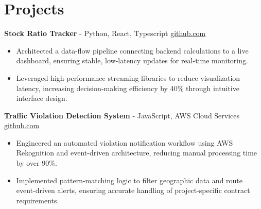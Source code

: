 \documentclass[11pt]{article}       %
\begin{document}

\vspace{-18.5pt}

\section*{Projects}

\textbf{Stock Ratio Tracker}{ - Python, React, Typescript} \hfill \href{https://github.com/Monica20030707/tradingDashboard-UI}{github.com} \\
\vspace{-9pt}
\begin{itemize}
  \item Architected a data-flow pipeline connecting backend calculations to a live dashboard, ensuring stable, low-latency updates for real-time monitoring.
  \item Leveraged high-performance streaming libraries to reduce visualization latency, increasing decision-making efficiency by 40\% through intuitive interface design.
\end{itemize}

\textbf{Traffic Violation Detection System}{ - JavaScript, AWS Cloud Services} \hfill \href{https://github.com/Monica20030707/AWS_rekonigition-N-read-database}{github.com} \\
\vspace{-9pt}
\begin{itemize}
  \item Engineered an automated violation notification workflow using AWS Rekognition and event-driven architecture, reducing manual processing time by over 90\%.
  \item Implemented pattern-matching logic to filter geographic data and route event-driven alerts, ensuring accurate handling of project-specific contract requirements.
\end{itemize}
\end{document}
